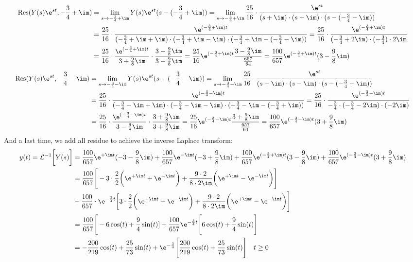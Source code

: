 \begin{align}
	\mathrm{Res}(Y(s)\e^{st},-\frac{3}{4}+\im)&=\lim\limits_{s\rightarrow-\frac{3}{4}+\im}Y(s)\e^{st}(s-(-\frac{3}{4}+\im))=\lim\limits_{s \rightarrow -\frac{3}{4}+\im}\frac{25}{16}\cdot\frac{\e^{st}}{(s+\im)\cdot(s-\im)\cdot(s-(-\frac{3}{4}-\im))} \nonumber \\
	&= \frac{25}{16}\cdot\frac{\e^{(-\frac{3}{4}+\im)t}}{(-\frac{3}{4}+\im+\im)\cdot(-\frac{3}{4}+\im-\im)\cdot(-\frac{3}{4}+\im-(-\frac{3}{4}-\im))}=\frac{25}{16}\cdot\frac{\e^{(-\frac{3}{4}+\im)t}}{(-\frac{3}{4}+2\im)\cdot(-\frac{3}{4})\cdot2\im} \nonumber \\
	&=\frac{25}{16}\cdot\frac{\e^{(-\frac{3}{4}+\im)t}}{3+\frac{9}{8}\im}\cdot\frac{3-\frac{9}{8}\im}{3-\frac{9}{8}\im}=\frac{25}{16}\e^{(-\frac{3}{4}+\im)t}\frac{3-\frac{9}{8}\im}{\frac{657}{64}}= \frac{100}{657}\e^{(-\frac{3}{4}+\im)t}(3-\frac{9}{8}\im)
\end{align}
\begin{align}
	\mathrm{Res}(Y(s)\e^{st},-\frac{3}{4}-\im)&=\lim\limits_{s\rightarrow-\frac{3}{4}-\im}Y(s)\e^{st}(s-(-\frac{3}{4}-\im))=\lim\limits_{s \rightarrow -\frac{3}{4}-\im}\frac{25}{16}\cdot\frac{\e^{st}}{(s+\im)\cdot(s-\im)\cdot(s-(-\frac{3}{4}+\im))} \nonumber \\
	&= \frac{25}{16}\cdot\frac{\e^{(-\frac{3}{4}-\im)t}}{(-\frac{3}{4}-\im+\im)\cdot(-\frac{3}{4}-\im-\im)\cdot(-\frac{3}{4}-\im-(-\frac{3}{4}+\im))}=\frac{25}{16}\cdot\frac{\e^{(-\frac{3}{4}-\im)t}}{-\frac{3}{4}\cdot(-\frac{3}{4}-2\im)\cdot(-2\im)} \nonumber \\
	&=\frac{25}{16}\cdot\frac{\e^{(-\frac{3}{4}-\im)t}}{3-\frac{9}{8}\im}\cdot\frac{3+\frac{9}{8}\im}{3+\frac{9}{8}\im}=\frac{25}{16}\e^{(-\frac{3}{4}-\im)t}\frac{3+\frac{9}{8}\im}{\frac{657}{64}}= \frac{100}{657}\e^{(-\frac{3}{4}-\im)t}(3+\frac{9}{8}\im)
\end{align}
And a last time, we add all residue to achieve the inverse Laplace transform:
\begin{align}
	y(t) = \mathcal{L}^{-1}\bigg [Y(s)\bigg ] &= \frac{100}{657}\e^{+\im t}(-3-\frac{9}{8}\im)+\frac{100}{657}\e^{-\im t}(-3+\frac{9}{8}\im)+\frac{100}{657}\e^{(-\frac{3}{4}+\im)t}(3-\frac{9}{8}\im)+\frac{100}{657}\e^{(-\frac{3}{4}-\im)t}(3+\frac{9}{8}\im)\nonumber \\
	&=\frac{100}{657}\Bigg [-3\cdot\frac{2}{2}\bigg (\e^{+\im t}+\e^{-\im t}\bigg )+\frac{9\cdot 2}{8\cdot2\im}\bigg (\e^{+\im t}-\e^{-\im t}\bigg )\Bigg ]\nonumber \\
	&+\frac{100}{657}\cdot\e^{-\frac{3}{4}t}\bigg [3\cdot\frac{2}{2}\bigg (\e^{+\im t}+\e^{-\im t}\bigg )+\frac{9\cdot2}{8\cdot2\im}\bigg (\e^{+\im t}-\e^{-\im t}\bigg )\Bigg ]\nonumber\\
	&=\frac{100}{657}\Bigg [-6\cos(t)+\frac{9}{4}\sin(t)]+\frac{100}{657}\e^{-\frac{3}{4}t}\Bigg [6\cos(t)+\frac{9}{4}\sin(t)\Bigg ] \nonumber \\
	&= -\frac{200}{219}\cos(t)+\frac{25}{73}\sin(t)+\e^{-\frac{3}{4}}\Bigg [\frac{200}{219}\cos(t)+\frac{25}{73}\sin(t) \Bigg ]\quad t \geq 0
\end{align}

